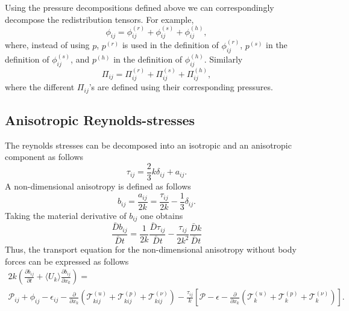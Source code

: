 \documentclass[oneside,a4paper,11pt]{report}
\newcommand{\rs}{\tau}          %
\newcommand{\ars}{a}            %
\newcommand{\redi}{\phi}        %
\newcommand{\ukavg}{\langle U_k \rangle}
\begin{document}
Using the pressure decompositions defined above we can correspondingly decompose the redistribution tensors. For example,
\begin{equation}
\redi_{ij} = \redi_{ij}^{(r)} + \redi_{ij}^{(s)} + \redi_{ij}^{(h)},
\end{equation}
where, instead of using $p$, $p^{(r)}$ is used in the definition of $\redi^{(r)}_{ij}$, $p^{(s)}$ in the definition of $\redi^{(s)}_{ij}$, and $p^{(h)}$ in the definition of $\redi^{(h)}_{ij}$. Similarly
\begin{equation}
\Pi_{ij} = \Pi^{(r)}_{ij} + \Pi^{(s)}_{ij} + \Pi^{(h)}_{ij},
\end{equation}
where the different $\Pi_{ij}$'s are defined using their corresponding pressures.

\subsection{Anisotropic Reynolds-stresses}

The reynolds stresses can be decomposed into an isotropic and an anisotropic component as follows
\begin{equation}
\rs_{ij} = \frac{2}{3} k \delta_{ij} + \ars_{ij}.
\end{equation}
A non-dimensional anisotropy is defined as follows
\begin{equation}
b_{ij} = \frac{a_{ij}}{2k} = \frac{\rs_{ij}}{2k} - \frac{1}{3} \delta_{ij}.
\end{equation}
Taking the material derivative of $b_{ij}$ one obtains 
\[ \frac{\bar{D} b_{ij}}{\bar{D}t} = \frac{1}{2k} \frac{\bar{D}\rs_{ij} }{\bar{D}t} - \frac{\rs_{ij}}{2k^2} \frac{\bar{D} k}{\bar{D}t} \]
Thus, the transport equation for the non-dimensional anisotropy without body forces can be expressed as follows
\begin{multline}
\label{anisotropy_eq}
2k \left( \frac{\partial b_{ij}}{\partial t} + \ukavg \frac{\partial b_{ij}}{\partial x_k} \right ) =\\ \mathcal{P}_{ij} + \redi_{ij} - \epsilon_{ij} - \frac{\partial}{\partial x_k} \left ( \mathcal{T}^{(u)}_{kij} + \mathcal{T}^{(p)}_{kij} + \mathcal{T}^{(\nu)}_{kij} \right ) - \frac{\rs_{ij}}{k} \left [ \mathcal{P} - \epsilon - \frac{\partial}{\partial x_k} \left ( \mathcal{T}^{(u)}_{k} + \mathcal{T}^{(p)}_{k} + \mathcal{T}^{(\nu)}_{k} \right ) \right ].
\end{multline}
\end{document}
